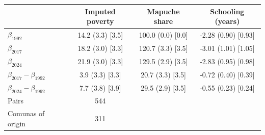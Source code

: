 \begin{tabular}{lccc}
\toprule
 & Imputed poverty & Mapuche share & Schooling (years) \\
\midrule
$\beta_{1992}$ & 14.2 (3.3) [3.5] & 100.0 (0.0) [0.0] & -2.28 (0.90) [0.93] \\
$\beta_{2017}$ & 18.2 (3.0) [3.3] & 120.7 (3.3) [3.5] & -3.01 (1.01) [1.05] \\
$\beta_{2024}$ & 21.9 (3.0) [3.3] & 129.5 (2.9) [3.5] & -2.83 (0.95) [0.98] \\
\midrule
$\beta_{2017}-\beta_{1992}$ & 3.9 (3.3) [3.3] & 20.7 (3.3) [3.5] & -0.72 (0.40) [0.39] \\
$\beta_{2024}-\beta_{1992}$ & 7.7 (3.8) [3.9] & 29.5 (2.9) [3.5] & -0.55 (0.23) [0.24] \\
\midrule
Pairs & 544 & & \\
Comunas of origin & 311 & & \\
\bottomrule
\end{tabular}
